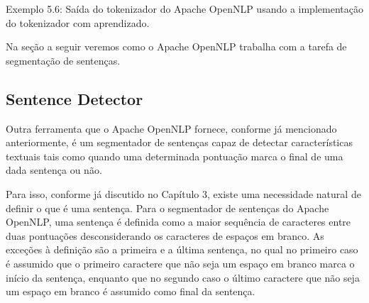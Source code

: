 \documentclass[11pt]{report}
\begin{document}
\begin{quote}
                 
             
     \fbox{,}                    \fbox{,}                   \fbox{,}            
   
\end{quote}
\begin{center}
  Exemplo 5.6: Saída do tokenizador do Apache OpenNLP usando a implementação do tokenizador com aprendizado.
\end{center}

Na seção a seguir veremos como o Apache OpenNLP trabalha com a tarefa de segmentação de sentenças.

\subsection{Sentence Detector}

\indent\indent Outra ferramenta que o Apache OpenNLP fornece, conforme já mencionado anteriormente, é um segmentador de sentenças capaz de detectar características textuais
tais como quando uma determinada pontuação marca o final de uma dada sentença ou não.

Para isso, conforme já discutido no Capítulo 3, existe uma
necessidade natural de definir o que é uma sentença. Para o segmentador de sentenças do Apache OpenNLP, uma sentença é definida como a maior sequência de caracteres entre duas
pontuações desconsiderando os caracteres de espaços em branco. As exceções à definição são a primeira e a última sentença, no qual no primeiro caso é assumido que o primeiro caractere que não
seja um espaço em branco marca o início da sentença, enquanto que no segundo caso o último caractere que não seja um espaço em branco é assumido como final da sentença.
\end{document}
